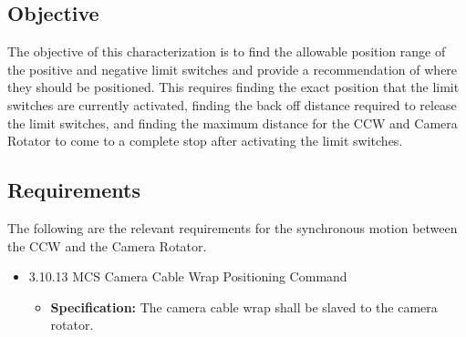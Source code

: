 \documentclass[SE,authoryear,toc, lsstdraft]{lsstdoc}
\begin{document}
\subsection{Objective}

The objective of this characterization is to find the allowable position
range of the positive and negative limit switches and provide a
recommendation of where they should be positioned. This requires finding
the exact position that the limit switches are currently activated,
finding the back off distance required to release the limit switches,
and finding the maximum distance for the CCW and Camera Rotator to come
to a complete stop after activating the limit switches.

\subsection{Requirements}

The following are the relevant requirements for the synchronous motion
between the CCW and the Camera Rotator.

\underline{}

\begin{itemize}
\item
  3.10.13 MCS Camera Cable Wrap Positioning Command

  \begin{itemize}
  \item
    \textbf{Specification:} The camera cable wrap shall be slaved to the
    camera rotator.
  \end{itemize}
\end{itemize}

\underline{}
\end{document}
